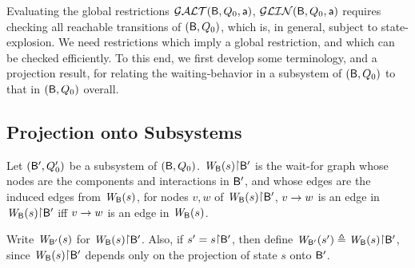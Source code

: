 
   \label{s:local.preamble}
%   

Evaluating the global restrictions $\GAO(\B,Q_0,\act)$, $\GLin(\B,Q_0,\act)$ requires checking all reachable transitions of
$(\B, Q_0)$, which is, in general, subject to state-explosion.
We need restrictions which imply a global restriction, 
and which can be checked efficiently.
%
To this end, we first develop some terminology, and a projection result, for relating the waiting-behavior in a
subsystem of $(\B,Q_0)$ to that in $(\B,Q_0)$ overall.



\subsection{Projection onto Subsystems}
\label{s:projection}

\begin{definition} \label{defn:projWgraph}
Let $(\B', Q'_0)$ be a subsystem of $(\B, Q_0)$. 
$\wfg{\B}{s} \pj \B'$ is the wait-for graph whose nodes are the
components and interactions in $\B'$, and whose edges are the induced
edges from $\wfg{\B}{s}$, \ie for nodes $v, w$ of $\wfg{\B}{s} \pj \B'$,
$v \ar w$ is an edge in $\wfg{\B}{s} \pj \B'$ iff $v \ar w$ is an edge in $\wfg{\B}{s}$.

Write $\lwfg{\B}{s}{\B'}$ for $\wfg{\B}{s} \pj \B'$.
Also, if $s' = s \pj \B'$, then define
$\lwfg{\B}{s'}{\B'} \df \wfg{\B}{s} \pj \B'$, since $\wfg{\B}{s} \pj \B'$ depends only
on the projection of state $s$ onto $\B'$.
\end{definition}



